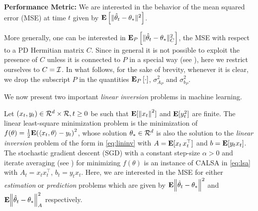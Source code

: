 \textbf{Performance Metric:}  
We are interested in the behavior of the mean squared error (MSE) at time $t$ given by $\mathbf{E}\left[\| \hat{\theta}_t-\theta_*\|^2\right]$. {More generally, one can be interested in $\mathbf{E}_P\left[\| \hat{\theta}_t-\theta_*\|_C^2\right]$, the MSE with respect to a PD Hermitian matrix $C$. Since in general it is not possible to exploit the presence of $C$ unless it is connected to $P$ in a special way (see ),
here we restrict ourselves to $C = \mathcal{I}$. In what follows, for the sake of brevity, whenever it is clear, we drop the subscript $P$ in the quantities $\mathbf{E}_P\left[\cdot\right]$, $\sigma^2_{A_P}$ and $\sigma^2_{b_P}$.
\begin{comment}
\footnote{We note here that $\E[\normsm{\thh_t-\ts}_C^2]$, which measures the MSE in the quadratic norm with respect to a positive definite matrix $C\succ 0$. However, unless $C$ has some special structure, it is not possible to exploit this generality in our bounds. Further, when data is bounded $\norm{C}^2$ is also bounded and it is straightforward to see that $\EEP{\norm{\thh_t-\ts}}^2_C\leq \norm{C}^2\EEP{\norm{\thh_t-\ts}^2}$. So, for the purpose of stating our results we will not use the general quadratic norm, however, will use it when we discuss the work by \cite{bach} in LSE, where its usage is relevant.}
\end{comment}
We now present two important \emph{linear inversion} problems in machine learning.
\begin{example}
Let $(x_t,y_t)\in \mathcal{R}^{d}\times \mathcal{R}, t\geq 0$ be \iid such that $\mathbf{E}[{\left\| x_t\right\|^2}]$ and $\mathbf{E}[y_t^2]$ are finite. The linear least-square minimization problem is the minimization of $
f(\theta)=\frac{1}{2}\mathbf{E}{\left(\langle x_t,\theta\rangle-y_t\right)^2}
$, whose solution $\theta_*\in \mathcal{R}^d$ is also the solution to the \emph{linear inversion} problem of the form in \eqref{eq:lininv} with $A=\mathbf{E}[{x_t\,x_t^\top}]$ and $b=\mathbf{E}[{y_t x_t}]$. 
The stochastic gradient descent (SGD) with a constant step-size $\alpha>0$ and iterate averaging (see \citet{bach}) for minimizing $f(\theta)$ is an instance of CALSA in \eqref{eq:lsa} with $A_t=x_tx_t^\top$, $b_t=y_t x_t$. Here, we are interested in the MSE for either \emph{estimation} or \emph{prediction} problems which are given by $\mathbf{E}{\left\| \hat{\theta}_t-\theta_*\right\|^2}$ and $\mathbf{E}{\left\| \hat{\theta}_t-\theta_*\right\|^2_A}$ respectively.

\end{example}}

